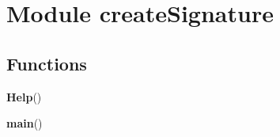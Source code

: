 %
%
%


\section{Module createSignature}

    \label{createSignature}


  \subsection{Functions}

    \label{createSignature:Help}

    \vspace{0.5ex}

\hspace{.8\funcindent}\begin{boxedminipage}{\funcwidth}

    \raggedright \textbf{Help}()

\setlength{\parskip}{2ex}
\setlength{\parskip}{1ex}
    \end{boxedminipage}

    \label{createSignature:main}

    \vspace{0.5ex}

\hspace{.8\funcindent}\begin{boxedminipage}{\funcwidth}

    \raggedright \textbf{main}()

\setlength{\parskip}{2ex}
\setlength{\parskip}{1ex}
    \end{boxedminipage}


